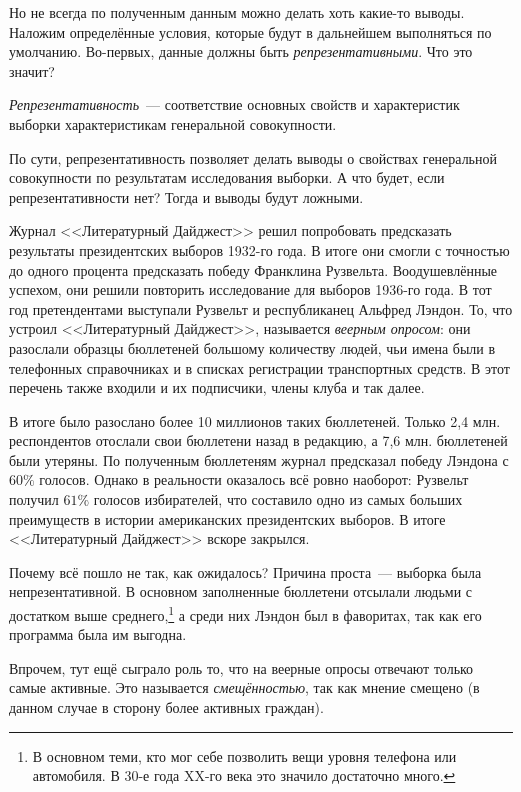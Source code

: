 Но не всегда по полученным данным можно делать хоть какие-то выводы. Наложим 
определённые условия, которые будут в дальнейшем выполняться по умолчанию. 
Во-первых, данные должны быть \emph{репрезентативными}. Что это значит?
\begin{definition}
	\emph{Репрезентативность}~--- соответствие основных свойств и характеристик 
	выборки характеристикам генеральной совокупности.
\end{definition} 
По сути, репрезентативность позволяет делать выводы о свойствах генеральной 
совокупности по результатам исследования выборки. А что будет, если 
репрезентативности нет? Тогда и выводы будут ложными.
\begin{example}
	Журнал <<Литературный Дайджест>> решил попробовать предсказать результаты 
	президентских выборов 1932-го года. В итоге они смогли с точностью до 
	одного процента предсказать победу Франклина Рузвельта. Воодушевлённые 
	успехом, они решили повторить исследование для выборов 1936-го года. В тот 
	год претендентами выступали Рузвельт и республиканец Альфред Лэндон. То, 
	что устроил <<Литературный Дайджест>>, называется \emph{веерным опросом}: 
	они разослали образцы бюллетеней большому количеству людей, чьи имена были 
	в телефонных справочниках и в списках регистрации транспортных средств. В 
	этот перечень также входили и их подписчики, члены клуба и так далее. 
	
	В итоге было разослано более 10 миллионов таких бюллетеней. Только 2,4 млн. 
	респондентов отослали свои бюллетени назад в редакцию, а 7,6 млн. 
	бюллетеней были утеряны. По полученным бюллетеням журнал предсказал победу 
	Лэндона с \(60\%\) голосов. Однако в реальности оказалось всё ровно 
	наоборот: Рузвельт получил \(61\%\) голосов избирателей, что составило одно 
	из самых больших преимуществ в истории американских президентских выборов. 
	В итоге <<Литературный Дайджест>> вскоре закрылся.
\end{example}

Почему всё пошло не так, как ожидалось? Причина проста~--- выборка была 
непрезентативной. В основном заполненные бюллетени отсылали людьми с достатком 
выше среднего,\footnote{В основном теми, кто мог себе позволить вещи уровня 
телефона или автомобиля. В 30-е года XX-го века это значило достаточно много.} 
а среди них Лэндон был в фаворитах, так как его программа была им выгодна. 

Впрочем, тут ещё сыграло роль то, что на веерные опросы отвечают только самые 
активные. Это называется \emph{смещённостью}, так как мнение смещено (в данном 
случае в сторону более активных граждан).

